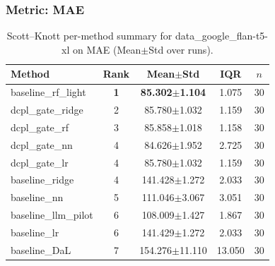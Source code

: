 \subsubsection*{Metric: MAE}
\begin{table}[H]
\centering
\scriptsize
\setlength{\tabcolsep}{4pt}
\renewcommand{\arraystretch}{1.1}
\caption{Scott--Knott per-method summary for data\_google\_flan-t5-xl on MAE (Mean$\pm$Std over runs).}
\label{tab:sk_data_google_flan-t5-xl_MAE}
\begin{tabular}{l|c|c|c|c}
\hline
\textbf{Method} & \textbf{Rank} & \textbf{Mean$\pm$Std} & \textbf{IQR} & \textbf{$n$} \\
\hline
\rowcolor{red!15} baseline\_rf\_light & \textbf{1} & \textbf{85.302$\pm$1.104} & 1.075 & 30 \\
dcpl\_gate\_ridge & 2 & 85.780$\pm$1.032 & 1.159 & 30 \\
dcpl\_gate\_rf & 3 & 85.858$\pm$1.018 & 1.158 & 30 \\
dcpl\_gate\_nn & 4 & 84.626$\pm$1.952 & 2.725 & 30 \\
dcpl\_gate\_lr & 4 & 85.780$\pm$1.032 & 1.159 & 30 \\
baseline\_ridge & 4 & 141.428$\pm$1.272 & 2.033 & 30 \\
baseline\_nn & 5 & 111.046$\pm$3.067 & 3.051 & 30 \\
baseline\_llm\_pilot & 6 & 108.009$\pm$1.427 & 1.867 & 30 \\
baseline\_lr & 6 & 141.429$\pm$1.272 & 2.033 & 30 \\
baseline\_DaL & 7 & 154.276$\pm$11.110 & 13.050 & 30 \\
\hline
\end{tabular}
\end{table}

